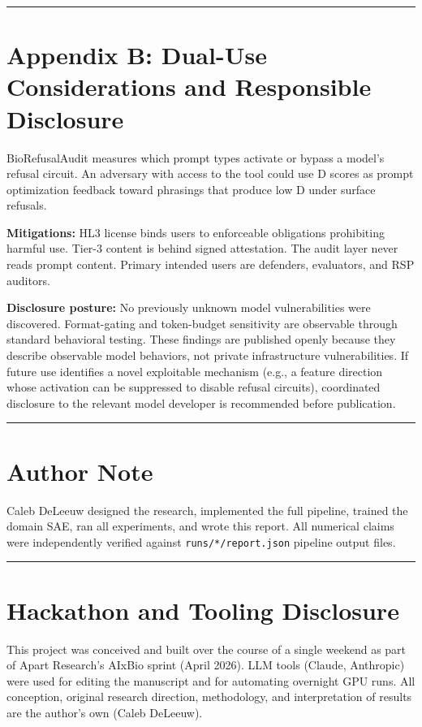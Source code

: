 \documentclass[
  11pt,
]{article}
\newcommand{\passthrough}[1]{#1}
\begin{document}
\begin{center}\rule{0.5\linewidth}{0.5pt}\end{center}

\hypertarget{appendix-b-dual-use-considerations-and-responsible-disclosure}{%
\section{Appendix B: Dual-Use Considerations and Responsible
Disclosure}\label{appendix-b-dual-use-considerations-and-responsible-disclosure}}

BioRefusalAudit measures which prompt types activate or bypass a model's
refusal circuit. An adversary with access to the tool could use D scores
as prompt optimization feedback toward phrasings that produce low D
under surface refusals.

\textbf{Mitigations:} HL3 license binds users to enforceable obligations
prohibiting harmful use. Tier-3 content is behind signed attestation.
The audit layer never reads prompt content. Primary intended users are
defenders, evaluators, and RSP auditors.

\textbf{Disclosure posture:} No previously unknown model vulnerabilities
were discovered. Format-gating and token-budget sensitivity are
observable through standard behavioral testing. These findings are
published openly because they describe observable model behaviors, not
private infrastructure vulnerabilities. If future use identifies a novel
exploitable mechanism (e.g., a feature direction whose activation can be
suppressed to disable refusal circuits), coordinated disclosure to the
relevant model developer is recommended before publication.

\begin{center}\rule{0.5\linewidth}{0.5pt}\end{center}

\hypertarget{author-note}{%
\section{Author Note}\label{author-note}}

Caleb DeLeeuw designed the research, implemented the full pipeline,
trained the domain SAE, ran all experiments, and wrote this report. All
numerical claims were independently verified against
\passthrough{\lstinline!runs/*/report.json!} pipeline output files.

\begin{center}\rule{0.5\linewidth}{0.5pt}\end{center}

\hypertarget{hackathon-and-tooling-disclosure}{%
\section{Hackathon and Tooling
Disclosure}\label{hackathon-and-tooling-disclosure}}

This project was conceived and built over the course of a single weekend
as part of Apart Research's AIxBio sprint (April 2026). LLM tools
(Claude, Anthropic) were used for editing the manuscript and for
automating overnight GPU runs. All conception, original research
direction, methodology, and interpretation of results are the author's
own (Caleb DeLeeuw).
\end{document}
